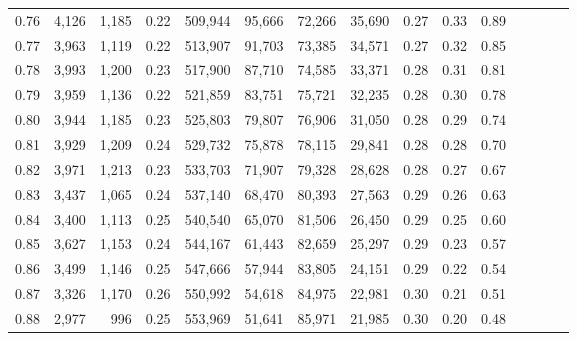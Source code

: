 \begin{tabular}{rrrcrrrrrrrrrrr}
0.76 &   4,126 &   1,185 &                                       0.22 &  509,944 &   95,666 &   72,266 &   35,690 &  0.27 &  0.33 &                         0.89 \\
0.77 &   3,963 &   1,119 &                                       0.22 &  513,907 &   91,703 &   73,385 &   34,571 &  0.27 &  0.32 &                         0.85 \\
0.78 &   3,993 &   1,200 &                                       0.23 &  517,900 &   87,710 &   74,585 &   33,371 &  0.28 &  0.31 &                         0.81 \\
0.79 &   3,959 &   1,136 &                                       0.22 &  521,859 &   83,751 &   75,721 &   32,235 &  0.28 &  0.30 &                         0.78 \\
0.80 &   3,944 &   1,185 &                                       0.23 &  525,803 &   79,807 &   76,906 &   31,050 &  0.28 &  0.29 &                         0.74 \\
0.81 &   3,929 &   1,209 &                                       0.24 &  529,732 &   75,878 &   78,115 &   29,841 &  0.28 &  0.28 &                         0.70 \\
0.82 &   3,971 &   1,213 &                                       0.23 &  533,703 &   71,907 &   79,328 &   28,628 &  0.28 &  0.27 &                         0.67 \\
0.83 &   3,437 &   1,065 &                                       0.24 &  537,140 &   68,470 &   80,393 &   27,563 &  0.29 &  0.26 &                         0.63 \\
0.84 &   3,400 &   1,113 &                                       0.25 &  540,540 &   65,070 &   81,506 &   26,450 &  0.29 &  0.25 &                         0.60 \\
0.85 &   3,627 &   1,153 &                                       0.24 &  544,167 &   61,443 &   82,659 &   25,297 &  0.29 &  0.23 &                         0.57 \\
0.86 &   3,499 &   1,146 &                                       0.25 &  547,666 &   57,944 &   83,805 &   24,151 &  0.29 &  0.22 &                         0.54 \\
0.87 &   3,326 &   1,170 &                                       0.26 &  550,992 &   54,618 &   84,975 &   22,981 &  0.30 &  0.21 &                         0.51 \\
0.88 &   2,977 &     996 &                                       0.25 &  553,969 &   51,641 &   85,971 &   21,985 &  0.30 &  0.20 &                         0.48 \\

\end{tabular}
